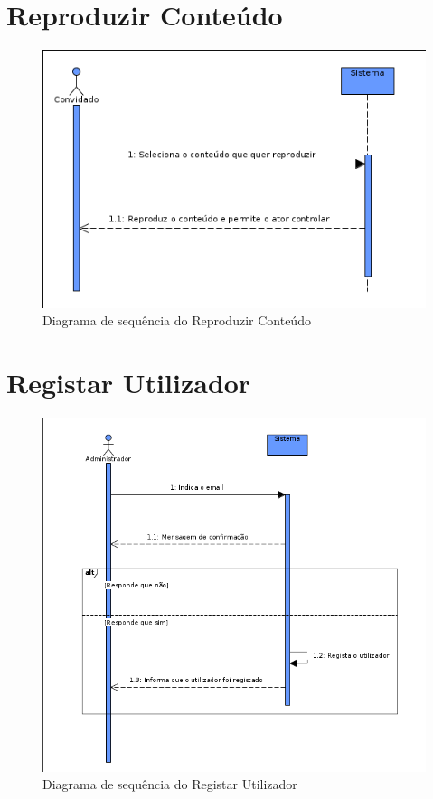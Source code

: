 \documentclass[a4paper]{report}
\begin{document}
\section{Reproduzir Conteúdo}
\begin{figure}[H]
	\centering 
    \includegraphics[width=\textwidth]{images/repconteudoSeq.png}  
    \caption{Diagrama de sequência do Reproduzir Conteúdo}
\end{figure}

\section{Registar Utilizador}
\begin{figure}[H]
	\centering 
    \includegraphics[width=\textwidth]{images/reguserSeq.png}  
    \caption{Diagrama de sequência do Registar Utilizador}
\end{figure}
\end{document}
